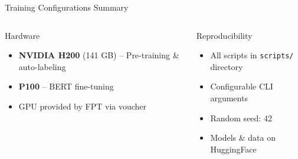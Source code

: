 \documentclass[10pt, aspectratio=169]{beamer}
\begin{document}
\begin{frame}[shrink=5]{Training Configurations Summary}
  \begin{table}[h]
    \centering
    \caption{Training configurations for all stages}
  \end{table}

  \vspace{0.2cm}
  \begin{columns}[T]
    \begin{block}{Hardware}
      \begin{itemize}
        \item \textbf{NVIDIA H200} (141 GB) -- Pre-training \& auto-labeling
        \item \textbf{P100} -- BERT fine-tuning
        \item GPU provided by FPT via voucher
      \end{itemize}
    \end{block}

    \begin{block}{Reproducibility}
      \begin{itemize}
        \item All scripts in \texttt{scripts/} directory
        \item Configurable CLI arguments
        \item Random seed: 42
        \item Models \& data on HuggingFace
      \end{itemize}
    \end{block}
  \end{columns}
\end{frame}
\end{document}
